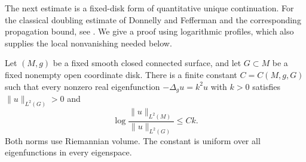 The next estimate is a fixed-disk form of quantitative unique
continuation.  For the classical doubling estimate of Donnelly and
Fefferman and the corresponding propagation bound, see
\cite[Theorem~4.1 and Lemma~4.14]{NazarovPolterovichSodin2005}.
We give a proof using logarithmic profiles, which also supplies the
local nonvanishing needed below.

\begin{proposition}
\label{prop:initial-growth}
Let $(M,g)$ be a fixed smooth closed connected surface, and let
$G\subset M$ be a fixed nonempty open coordinate disk.  There is
a finite constant $C=C(M,g,G)$ such that every nonzero real
eigenfunction $-\Delta_g u=k^2u$ with $k>0$ satisfies
$\|u\|_{L^2(G)}>0$ and
\begin{equation}\label{eq:initial-growth}
 \log\frac{\|u\|_{L^2(M)}}{\|u\|_{L^2(G)}}\le Ck.
\end{equation}
Both norms use Riemannian volume.  The constant is uniform over
all eigenfunctions in every eigenspace.
\end{proposition}

